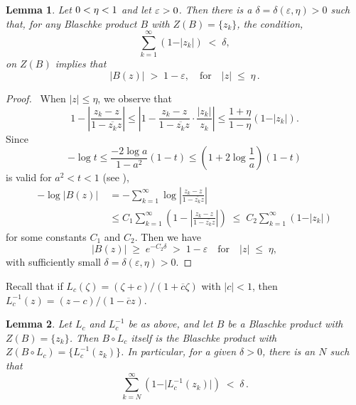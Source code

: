 \documentclass[12pt]{amsart}
\theoremstyle{plain}
\newtheorem{lem}{Lemma}[section]
\numberwithin{equation}{section}
\begin{document}
\begin{lem}
\label{lem4.1}
Let $\/0<\eta<1$ and let $\/\varepsilon > 0$. Then there is a
$\delta=\delta(\varepsilon,\eta) > 0$ such that, for any
Blaschke product $B$ with $Z(B)=\{z_k\}$,
the condition,
$$
\sum_{k=1}^\infty (1-\vert z_k\vert)\; <\;\delta,
$$
on $Z(B)$ implies that
\begin{equation}
\label{eq4.1}
\vert B(z)\vert\; >\; 1-\varepsilon, \quad
\text{for} \quad \vert z \vert \;\le\; \eta\,.
\end{equation}
\end{lem}

\begin{proof}
\, When $\vert z\vert \le \eta$, we observe that
\begin{equation}
\label{eq4.2}
1 - \left \vert \frac{z_k - z}{1 - \overline{z_k}z} \right \vert \leq
\left \vert 1 - \frac{z_k - z}{1 - \overline{z_k}z}\cdot
\frac{\vert z_k\vert}{z_k} \right \vert
\leq \frac{1+\eta}{1-\eta}\left(1-\vert z_k\vert\right).
\end{equation}
Since
$$
-\log t \le \frac{-2\log a}{1-a^2}(1-t)
\le (1+2\log\frac{1}{a})(1-t)
$$
is valid for $a^2<t<1$ (see \cite[Chapter VII, Lemma 1.2]{Ga}),
\begin{align*}
-\log \vert B(z)\vert\;&=-\sum_{k=1}^\infty \log \left \vert
\frac{z_k - z}{1 - \overline{z_k}z} \right \vert \\
&\le C_1 \sum_{k=1}^\infty \left (1 - \left \vert
\frac{z_k - z}{1 - \overline{z_k}z} \right \vert\right ) \;\le\;
C_2\sum_{k=1}^\infty \left(1-\vert z_k\vert \right)
\end{align*}
for some constants $C_1$ and $C_2$. Then we have
\begin{equation*}
\vert B(z)\vert\; \ge \;e^{-C_2\delta}\;>\; 1-\varepsilon \quad \text{for} \quad \vert z \vert \;\le\; \eta,
\end{equation*}
with sufficiently small $\delta=\delta(\varepsilon,\eta) > 0$.
\end{proof}
Recall that if $L_c(\zeta)= (\zeta + c)/(1 + \overline{c}\zeta)$
with $\vert c \vert < 1$, then
$L_c^{-1}(z)= (z -c)/(1 - \overline{c}z)$.

\begin{lem}
\label{lem4.2}
Let $L_c$ and $L_c^{-1}$ be as above, and let $B$ be a Blaschke
product with $Z(B)=\{z_k\}$. Then $B\circ L_c$ itself is the Blaschke
product with $Z(B\circ L_c)=\{L_c^{-1}(z_k)\}$. In particular, for a given
$\delta>0$, there is an $N$ such that
$$
\sum_{k=N}^\infty (1-\vert L_c^{-1}(z_k)\vert)\; <\;\delta\,.
$$
\end{lem}
\end{document}

